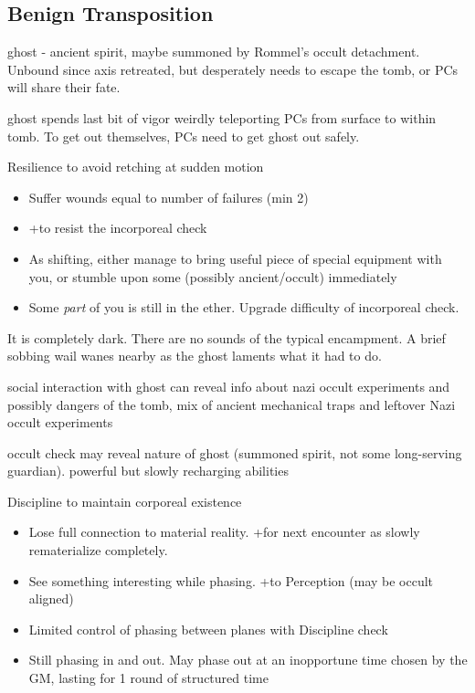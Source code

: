 \documentclass[background]{book}
\newcommand{\df}{\DifficultyDie}
\newcommand{\stb}{\SetbackDie}
\newcommand{\ch}{\ChallengeDie}
\newcommand{\bbb}{\BoostDie}
\begin{document}
\begin{multicols}{2}
\section{Benign Transposition}

ghost - ancient spirit, maybe summoned by Rommel's occult detachment.  Unbound since axis retreated, but desperately needs to escape the tomb, or PCs will share their fate.

ghost spends last bit of vigor weirdly teleporting PCs from surface to within tomb.  To get out themselves, PCs need to get ghost out safely.

\df\df\df Resilience to avoid retching at sudden motion
    \begin{itemize}
        \item \Failure Suffer wounds equal to number of failures (min 2)
        \item \Advantage +\bbb to resist the incorporeal check
        \item \Triumph As shifting, either manage to bring useful piece of special equipment with you, or stumble upon some (possibly ancient/occult) immediately
        \item \Despair Some \emph{part} of you is still in the ether.  Upgrade difficulty of incorporeal check.
    \end{itemize}


It is completely dark.  There are no sounds of the typical encampment.  A brief sobbing wail wanes nearby as the ghost laments what it had to do.

social interaction with ghost can reveal info about nazi occult experiments and possibly dangers of the tomb, mix of ancient mechanical traps and leftover Nazi occult experiments

    occult check may reveal nature of ghost (summoned spirit, not some long-serving guardian).  powerful but slowly recharging abilities

\ch\df Discipline to maintain corporeal existence
    \begin{itemize}
        \item \Failure Lose full connection to material reality.  +\stb for next encounter as slowly rematerialize completely.
        \item \Advantage See something interesting while phasing.  +\bbb to Perception (may be occult aligned)
        \item \Triumph Limited control of phasing between planes with \df\df\df Discipline check
        \item \Despair Still phasing in and out.  May phase out at an inopportune time chosen by the GM, lasting for 1 round of structured time
    \end{itemize}


\end{multicols}
\end{document}
